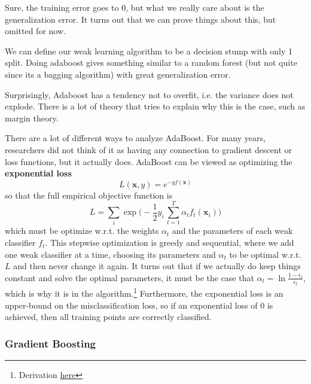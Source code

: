         Sure, the training error goes to $0$, but what we really care about is the generalization error. It turns out that we can prove things about this, but omitted for now. 

        \begin{example}
          We can define our weak learning algorithm to be a decision stump with only 1 split. Doing adaboost gives something similar to a random forest (but not quite since its a bagging algorithm) with great generalization error. 
        \end{example}

        Surprisingly, Adaboost has a tendency not to overfit, i.e. the variance does not explode. There is a lot of theory that tries to explain why this is the case, such as margin theory. 

        There are a lot of different ways to analyze AdaBoost. For many years, researchers did not think of it as having any connection to gradient descent or loss functions, but it actually does. AdaBoost can be viewed as optimizing the \textbf{exponential loss} 
        \begin{equation}
          L(\mathbf{x}, y) = e^{-y f(\mathbf{x})} 
        \end{equation}
        so that the full empirical objective function is 
        \begin{equation}
          L = \sum_i \exp \bigg( -\frac{1}{2} y_i \, \sum_{t=1}^T \alpha_t f_t (\mathbf{x}_i)\bigg)
        \end{equation}
        which must be optimize w.r.t. the weights $\alpha_t$ and the parameters of each weak classifier $f_t$. This stepwise optimization is greedy and sequential, where we add one weak classifier at a time, choosing its parameters and $\alpha_t$ to be optimal w.r.t. $L$ and then never change it again. It turns out that if we actually do keep things constant and solve the optimal parameters, it must be the case that $\alpha_t = \ln \frac{1 - \epsilon_t}{\epsilon_t}$, which is why it is in the algorithm.\footnote{Derivation \href{https://www.cs.toronto.edu/~mbrubake/teaching/C11/Handouts/AdaBoost.pdf}{here}} Furthermore, the exponential loss is an upper-bound on the misclassification loss, so if an exponential loss of $0$ is achieved, then all training points are correctly classified. 

      \subsubsection{Gradient Boosting}


